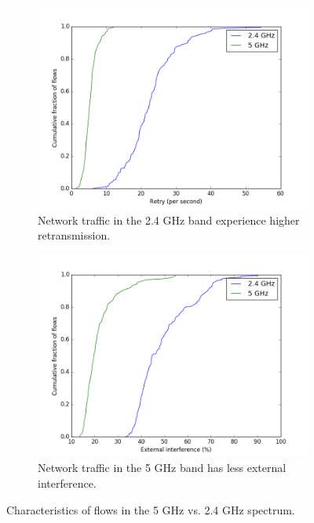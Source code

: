 \begin{figure}
\hspace*{\fill} %
\begin{subfigure}{0.45\textwidth}
\includegraphics[width=\linewidth]{figure/retries(2g_vs_5g).png}
\caption{Network traffic in the 2.4 GHz band experience higher retransmission.} 
\label{fig:retries}
\end{subfigure}
\hspace*{\fill} %
\begin{subfigure}{0.5\textwidth}
\includegraphics[width=\linewidth]{figure/external_interference(2g_vs_5g).png}
\caption{Network traffic in the 5 GHz band has less external interference.} 
\label{fig:interference}
\end{subfigure}
\caption{Characteristics of flows in the 5 GHz vs. 2.4 GHz spectrum.} 
\label{fig:5gvs2g}
\end{figure}

